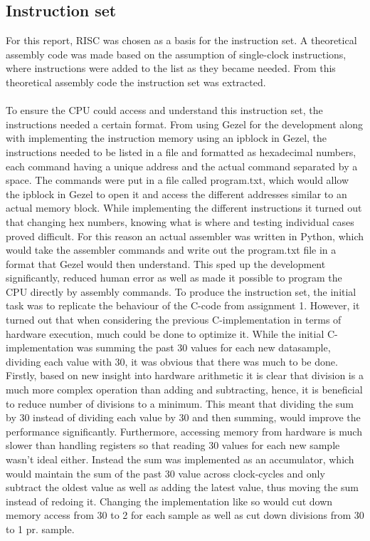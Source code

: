 \documentclass[12pt,a4paper]{article}
\begin{document}
\subsection{Instruction set}
	For this report, RISC was chosen as a basis for the instruction set. A theoretical assembly code was made based on the assumption of single-clock instructions, where instructions were added to the list as they became needed. From this theoretical assembly code the instruction set was extracted.\\
	\\
	To ensure the CPU could access and understand this instruction set, the instructions needed a certain format. From using Gezel for the development along with implementing the instruction memory using an ipblock in Gezel, the instructions needed to be listed in a file and formatted as hexadecimal numbers, each command having a unique address and the actual command separated by a space. The commands were put in a file called program.txt, which would allow the ipblock in Gezel to open it and access the different addresses similar to an actual memory block.
	While implementing the different instructions it turned out that changing hex numbers, knowing what is where and testing individual cases proved difficult. For this reason an actual assembler was written in Python, which would take the assembler commands and write out the program.txt file in a format that Gezel would then understand. This sped up the development significantly, reduced human error as well as made it possible to program the CPU directly by assembly commands.
	To produce the instruction set, the initial task was to replicate the behaviour of the C-code from assignment 1. However, it turned out that when considering the previous C-implementation in terms of hardware execution, much could be done to optimize it. While the initial C-implementation was summing the past 30 values for each new datasample, dividing each value with 30, it was obvious that there was much to be done.
	Firstly, based on new insight into hardware arithmetic it is clear that division is a much more complex operation than adding and subtracting, hence, it is beneficial to reduce number of divisions to a minimum. This meant that dividing the sum by 30 instead of dividing each value by 30 and then summing, would improve the performance significantly. Furthermore, accessing memory from hardware is much slower than handling registers so that reading 30 values for each new sample wasn't ideal either. Instead the sum was implemented as an accumulator, which would maintain the sum of the past 30 value across clock-cycles and only subtract the oldest value as well as adding the latest value, thus moving the sum instead of redoing it. Changing the implementation like so would cut down memory access from 30 to 2 for each sample as well as cut down divisions from 30 to 1 pr. sample. 
\end{document}
